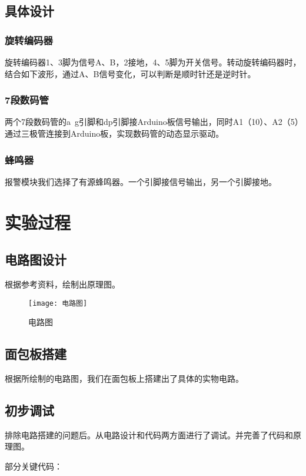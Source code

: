 \documentclass{../source/Experiment}
\begin{document}
        \subsection{具体设计}
            \subsubsection{旋转编码器}
            旋转编码器1、3脚为信号A、B，2接地，4、5脚为开关信号。转动旋转编码器时，结合如下波形，通过A、B信号变化，可以判断是顺时针还是逆时针。
            \subsubsection{7段数码管}
            两个7段数码管的a~g引脚和dp引脚接Arduino板信号输出，同时A1（10）、A2（5）通过三极管连接到Arduino板，实现数码管的动态显示驱动。

            \subsubsection{蜂鸣器}
            报警模块我们选择了有源蜂鸣器。一个引脚接信号输出，另一个引脚接地。
    \section{实验过程}
            \subsection{电路图设计}
            根据参考资料，绘制出原理图。
            \begin{figure}[H]
                \centering
                \texttt{[image: 电路图]}
                \caption{电路图}
            \end{figure}
            \subsection{面包板搭建}
            根据所绘制的电路图，我们在面包板上搭建出了具体的实物电路。
            \subsection{初步调试}
            排除电路搭建的问题后。从电路设计和代码两方面进行了调试。并完善了代码和原理图。
            
            部分关键代码：
\end{document}
